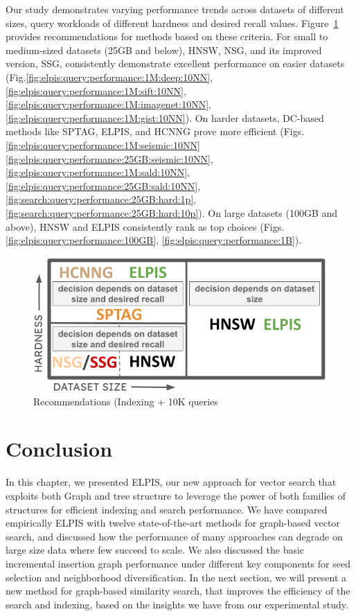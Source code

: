Our study demonstrates varying performance trends across datasets of different sizes, query workloads of different hardness and desired recall values. Figure~\ref{fig:recgann} provides recommendations for methods based on these criteria.  For small to medium-sized datasets (25GB and below), HNSW, NSG, and its improved version, SSG, consistently demonstrate excellent performance on easier datasets (Fig.\ref{fig:elpis:query:performance:1M:deep:10NN}, \ref{fig:elpis:query:performance:1M:sift:10NN}, \ref{fig:elpis:query:performance:1M:imagenet:10NN}, \ref{fig:elpis:query:performance:1M:gist:10NN}).  On harder datasets, DC-based methods like SPTAG, ELPIS, and HCNNG prove more efficient (Figs. \ref{fig:elpis:query:performance:1M:seismic:10NN} \ref{fig:elpis:query:performance:25GB:seismic:10NN}, \ref{fig:elpis:query:performance:1M:sald:10NN}, \ref{fig:elpis:query:performance:25GB:sald:10NN}, \ref{fig:search:query:performance:25GB:hard:1p}, \ref{fig:search:query:performance:25GB:hard:10p}). 
On large datasets (100GB and above), HNSW and ELPIS consistently rank as top choices (Figs.\ref{fig:elpis:query:performance:100GB}, \ref{fig:elpis:query:performance:1B}). 

\begin{figure}
\centering
  \captionsetup{justification=centering}
    \includegraphics[width=0.6\columnwidth]{img/Experiments/recgann.png}
	 \caption{Recommendations (Indexing + 10K queries} 
    \label{fig:recgann}
	
\end{figure}

\section{Conclusion}
In this chapter, we presented ELPIS, our new approach for vector search that exploits both Graph and tree structure to leverage the power of both families of structures for efficient indexing and search performance. We have compared empirically ELPIS with twelve state-of-the-art methods for graph-based vector search, and discussed how the performance of many approaches can degrade on large size data where few succeed to scale. We also discussed the basic incremental insertion graph performance under different key components for seed selection and neighborhood diversification.
In the next section, we will present a new method for graph-based similarity search, that improves the efficiency of the search and indexing, based on the insights we have from our experimental study.
